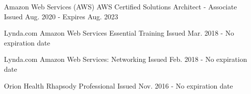 


\begin{cventries}


\cventry
{Amazon Web Services (AWS)} %
{AWS Certified Solutions Architect - Associate} %
{} %
{Issued Aug. 2020 - Expires Aug. 2023} %
{ %
}


\cventry
{Lynda.com} %
{Amazon Web Services Essential Training} %
{} %
{Issued Mar. 2018 - No expiration date} %
{ %
}


\cventry
{Lynda.com} %
{Amazon Web Services: Networking} %
{} %
{Issued Feb. 2018 - No expiration date} %
{ %
}


\cventry
{Orion Health} %
{Rhapsody Professional} %
{} %
{Issued Nov. 2016 - No expiration date} %
{ %
}


\end{cventries}

